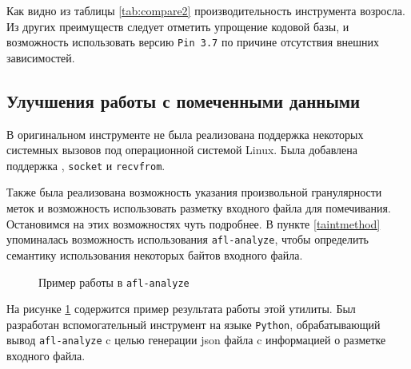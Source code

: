 Как видно из таблицы \ref{tab:compare2} производительность инструмента возросла. Из других преимуществ следует отметить упрощение кодовой базы, и возможность использовать версию \texttt{Pin 3.7} по причине отсутствия внешних зависимостей.

\subsection{Улучшения работы с помеченными данными}

В оригинальном инструменте не была реализована поддержка некоторых системных вызовов под операционной системой Linux. Была добавлена поддержка , \texttt{socket} и \texttt{recvfrom}.

Также была реализована возможность указания произвольной гранулярности меток и возможность использовать разметку входного файла для помечивания. Остановимся на этих возможностях чуть подробнее. 
В пункте \ref{taintmethod} упоминалась возможность использования \texttt{afl-analyze}, чтобы определить семантику использования некоторых байтов входного файла. 

\begin{figure}[H]
    \caption{Пример работы в \texttt{afl-analyze}}
    \label{fig:afl-analyze}
\end{figure}

На рисунке \ref{fig:afl-analyze} содержится пример результата работы этой утилиты. Был разработан вспомогательный инструмент на языке \texttt{Python}, обрабатывающий вывод \texttt{afl-analyze} c целью генерации json файла c информацией о разметке входного файла.

